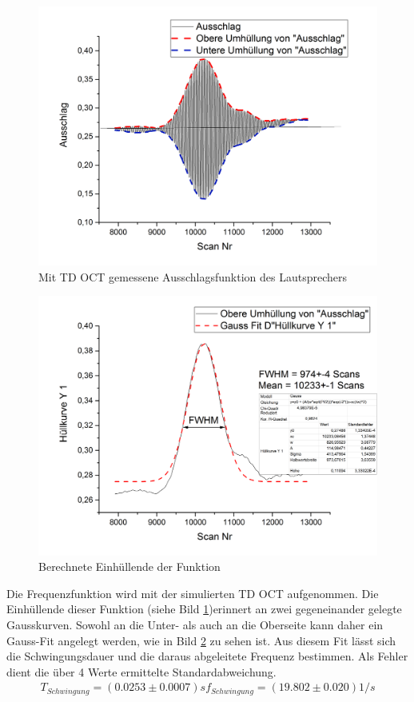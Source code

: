 \documentclass[german, %
parskip=full, %
bibliography=totoc, %
]{scrartcl}
\begin{document}
\begin{figure}[ht]
	\centering
	  \includegraphics[width=\textwidth]{TD_OCT_DATA_Einhullende}
	\caption{Mit TD OCT gemessene Ausschlagsfunktion des Lautsprechers}
	\label{fig:Funktion}
\end{figure}
\begin{figure}[ht]
  \centering
	  \includegraphics[width=\textwidth]{TD_OCT_FINAL}
  \caption{Berechnete Einhüllende der Funktion}
	\label{fig:hull}
\end{figure}

Die Frequenzfunktion wird mit der simulierten TD OCT aufgenommen. Die Einhüllende dieser Funktion (siehe Bild \ref{fig:Funktion})erinnert an zwei gegeneinander gelegte Gausskurven. Sowohl an die Unter- als auch an die Oberseite kann daher ein Gauss-Fit angelegt werden, wie in Bild \ref{fig:hull} zu sehen ist. Aus diesem Fit lässt sich die Schwingungsdauer und die daraus abgeleitete Frequenz bestimmen. Als Fehler dient die über 4 Werte ermittelte Standardabweichung.
\begin{align*}
T_{Schwingung} = (0.0253 \pm 0.0007) s
f_{Schwingung} = (19.802 \pm 0.020) 1/s
\end{align*}
\end{document}
